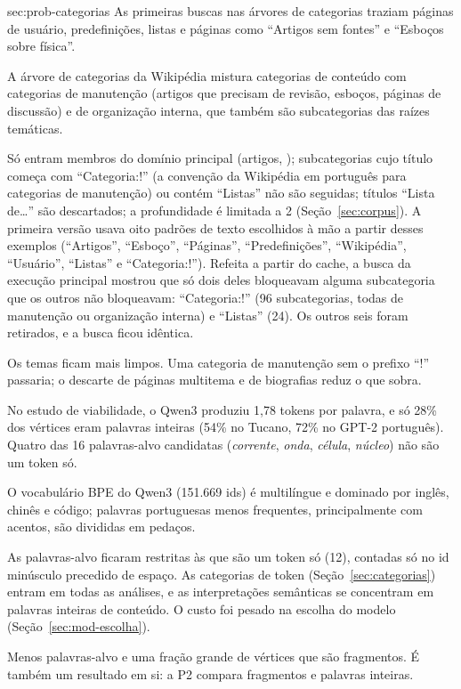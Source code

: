 {sec:prob-categorias}
{As primeiras buscas nas árvores de categorias traziam páginas de usuário, predefinições,
listas e páginas como ``Artigos sem fontes'' e ``Esboços sobre física''.}
{\item[Causa.] A árvore de categorias da Wikipédia mistura categorias de conteúdo com
categorias de manutenção (artigos que precisam de revisão, esboços, páginas de discussão) e de
organização interna, que também são subcategorias das raízes temáticas.
\item[Solução.] Só entram membros do domínio principal (artigos, ); subcategorias cujo
título começa com ``Categoria:!'' (a convenção da Wikipédia em português para categorias de
manutenção) ou contém ``Listas'' não são seguidas; títulos ``Lista de\ldots'' são
descartados; a profundidade é limitada a 2 (Seção~\ref{sec:corpus}). A primeira versão
usava oito padrões de texto escolhidos à mão a partir desses exemplos (``Artigos'',
``Esboço'', ``Páginas'', ``Predefinições'', ``Wikipédia'', ``Usuário'', ``Listas'' e
``Categoria:!''). Refeita a partir do cache, a busca da execução principal mostrou que só
dois deles bloqueavam alguma subcategoria que os outros não bloqueavam: ``Categoria:!''
(96 subcategorias, todas de manutenção ou organização interna) e ``Listas'' (24). Os outros
seis foram retirados, e a busca ficou idêntica.}
{Os temas ficam mais limpos. Uma categoria de manutenção sem o prefixo ``!'' passaria; o
descarte de páginas multitema e de biografias reduz o que sobra.}

{No estudo de viabilidade, o Qwen3 produziu 1,78 tokens por palavra, e só 28\% dos vértices
eram palavras inteiras (54\% no Tucano, 72\% no GPT-2 português). Quatro das 16 palavras-alvo
candidatas (\emph{corrente}, \emph{onda}, \emph{célula}, \emph{núcleo}) não são um token só.}
{\item[Causa.] O vocabulário BPE do Qwen3 (151.669 ids) é multilíngue e dominado por inglês,
chinês e código; palavras portuguesas menos frequentes, principalmente com acentos, são
divididas em pedaços.
\item[Solução.] As palavras-alvo ficaram restritas às que são um token só (12), contadas só no id
minúsculo precedido de espaço. As categorias de token (Seção~\ref{sec:categorias}) entram em
todas as análises, e as interpretações semânticas se concentram em palavras inteiras de
conteúdo. O custo foi pesado na escolha do modelo (Seção~\ref{sec:mod-escolha}).}
{Menos palavras-alvo e uma fração grande de vértices que são fragmentos. É também um resultado
em si: a P2 compara fragmentos e palavras inteiras.}

